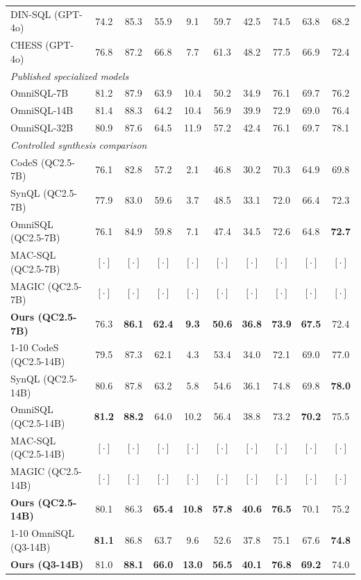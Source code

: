 \documentclass[letterpaper,journal]{IEEEtran}
\begin{document}
\begin{table}[t]
\begin{tabular}{@{}lccccccccc@{}}
DIN-SQL (GPT-4o) & 74.2 & 85.3 & 55.9 & 9.1  & 59.7 & 42.5 & 74.5 & 63.8 & 68.2 \\
CHESS (GPT-4o)   & 76.8 & 87.2 & 66.8 & 7.7  & 61.3 & 48.2 & 77.5 & 66.9 & 72.4 \\
\midrule
\multicolumn{10}{l}{\emph{Published specialized models}} \\
\midrule
OmniSQL-7B       & 81.2 & 87.9 & 63.9 & 10.4 & 50.2 & 34.9 & 76.1 & 69.7 & 76.2 \\
OmniSQL-14B      & 81.4 & 88.3 & 64.2 & 10.4 & 56.9 & 39.9 & 72.9 & 69.0 & 76.4 \\
OmniSQL-32B      & 80.9 & 87.6 & 64.5 & 11.9 & 57.2 & 42.4 & 76.1 & 69.7 & 78.1 \\
\midrule
\multicolumn{10}{l}{\emph{Controlled synthesis comparison}} \\
\midrule
CodeS (QC2.5-7B)         & 76.1 & 82.8 & 57.2 & 2.1  & 46.8 & 30.2 & 70.3 & 64.9 & 69.8 \\
SynQL (QC2.5-7B)         & 77.9 & 83.0 & 59.6 & 3.7  & 48.5 & 33.1 & 72.0 & 66.4 & 72.3 \\
OmniSQL (QC2.5-7B)       & 76.1 & 84.9 & 59.8 & 7.1  & 47.4 & 34.5 & 72.6 & 64.8 & \textbf{72.7} \\
MAC-SQL (QC2.5-7B)       & $[\cdot]$ & $[\cdot]$ & $[\cdot]$ & $[\cdot]$ & $[\cdot]$ & $[\cdot]$ & $[\cdot]$ & $[\cdot]$ & $[\cdot]$ \\
MAGIC (QC2.5-7B)         & $[\cdot]$ & $[\cdot]$ & $[\cdot]$ & $[\cdot]$ & $[\cdot]$ & $[\cdot]$ & $[\cdot]$ & $[\cdot]$ & $[\cdot]$ \\
\textbf{Ours (QC2.5-7B)} & 76.3 & \textbf{86.1} & \textbf{62.4} & \textbf{9.3} & \textbf{50.6} & \textbf{36.8} & \textbf{73.9} & \textbf{67.5} & 72.4 \\
\cmidrule{1-10}
CodeS (QC2.5-14B)        & 79.5 & 87.3 & 62.1 & 4.3  & 53.4 & 34.0 & 72.1 & 69.0 & 77.0 \\
SynQL (QC2.5-14B)        & 80.6 & 87.8 & 63.2 & 5.8  & 54.6 & 36.1 & 74.8 & 69.8 & \textbf{78.0} \\
OmniSQL (QC2.5-14B)      & \textbf{81.2} & \textbf{88.2} & 64.0 & 10.2 & 56.4 & 38.8 & 73.2 & \textbf{70.2} & 75.5 \\
MAC-SQL (QC2.5-14B)      & $[\cdot]$ & $[\cdot]$ & $[\cdot]$ & $[\cdot]$ & $[\cdot]$ & $[\cdot]$ & $[\cdot]$ & $[\cdot]$ & $[\cdot]$ \\
MAGIC (QC2.5-14B)        & $[\cdot]$ & $[\cdot]$ & $[\cdot]$ & $[\cdot]$ & $[\cdot]$ & $[\cdot]$ & $[\cdot]$ & $[\cdot]$ & $[\cdot]$ \\
\textbf{Ours (QC2.5-14B)}& 80.1 & 86.3 & \textbf{65.4} & \textbf{10.8} & \textbf{57.8} & \textbf{40.6} & \textbf{76.5} & 70.1 & 75.2 \\
\cmidrule{1-10}
OmniSQL (Q3-14B)         & \textbf{81.1} & 86.8 & 63.7 & 9.6  & 52.6 & 37.8 & 75.1 & 67.6 & \textbf{74.8} \\
\textbf{Ours (Q3-14B)}   & 81.0 & \textbf{88.1} & \textbf{66.0} & \textbf{13.0} & \textbf{56.5} & \textbf{40.1} & \textbf{76.8} & \textbf{69.2} & 74.0 \\
\bottomrule
\end{tabular}


\end{table}
\end{document}
